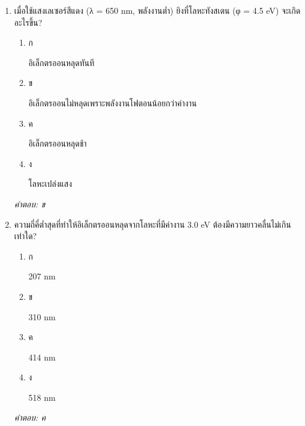 \documentclass[12pt]{article}
\begin{document}
\begin{enumerate}[label=\arabic*., itemsep=0.5\baselineskip, topsep=0.5\baselineskip, leftmargin=*]
\item เมื่อใช้แสงเลเซอร์สีแดง (λ = 650 nm, พลังงานต่ำ) ยิงที่โลหะทังสเตน (φ = 4.5 eV) จะเกิดอะไรขึ้น?
\begin{enumerate}[label=\alph*)., itemsep=0.3\baselineskip, topsep=0.3\baselineskip]
\item ก\ 
\begin{minipage}[t]{0.9\linewidth}
\raggedright อิเล็กตรออนหลุดทันที
\end{minipage}
\item ข\ 
\begin{minipage}[t]{0.9\linewidth}
\raggedright อิเล็กตรออนไม่หลุดเพราะพลังงานโฟตอนน้อยกว่าค่างาน
\end{minipage}
\item ค\ 
\begin{minipage}[t]{0.9\linewidth}
\raggedright อิเล็กตรออนหลุดช้า
\end{minipage}
\item ง\ 
\begin{minipage}[t]{0.9\linewidth}
\raggedright โลหะเปล่งแสง
\end{minipage}
\end{enumerate}
\vspace{-0.3\baselineskip}
\begin{small}
\textit{คำตอบ: ข}
\end{small}

\item ความถี่คี่ต่ำสุดที่ทำให้อิเล็กตรออนหลุดจากโลหะที่มีค่างาน 3.0 eV ต้องมีความยาวคลื่นไม่เกินเท่าใด?
\begin{enumerate}[label=\alph*)., itemsep=0.3\baselineskip, topsep=0.3\baselineskip]
\item ก\ 
\begin{minipage}[t]{0.9\linewidth}
\raggedright 207 nm
\end{minipage}
\item ข\ 
\begin{minipage}[t]{0.9\linewidth}
\raggedright 310 nm
\end{minipage}
\item ค\ 
\begin{minipage}[t]{0.9\linewidth}
\raggedright 414 nm
\end{minipage}
\item ง\ 
\begin{minipage}[t]{0.9\linewidth}
\raggedright 518 nm
\end{minipage}
\end{enumerate}
\vspace{-0.3\baselineskip}
\begin{small}
\textit{คำตอบ: ค}
\end{small}


\end{enumerate}
\end{document}
